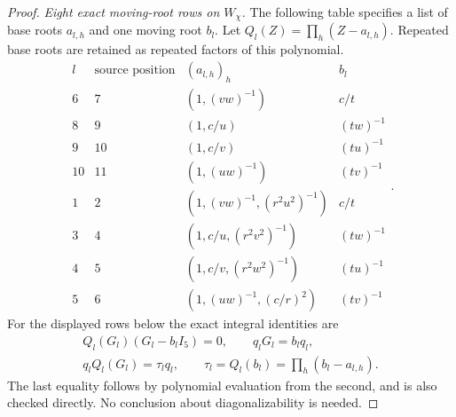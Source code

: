 \begin{proof}
\emph{Eight exact moving-root rows on $W_\chi$.}
The following table specifies a list of base
roots $a_{l,h}$ and one moving root $b_l$.
Let $Q_l(Z)=\prod_h(Z-a_{l,h})$.
Repeated base roots are retained as repeated
factors of this polynomial.
\[
 \begin{array}{c|c|c|c}
 l&\text{source position}&(a_{l,h})_h&b_l\\\hline
 6&7&(1,(vw)^{-1})&c/t\\
 8&9&(1,c/u)&(tw)^{-1}\\
 9&10&(1,c/v)&(tu)^{-1}\\
 10&11&(1,(uw)^{-1})&(tv)^{-1}\\
 1&2&(1,(vw)^{-1},(r^2u^2)^{-1})&c/t\\
 3&4&(1,c/u,(r^2v^2)^{-1})&(tw)^{-1}\\
 4&5&(1,c/v,(r^2w^2)^{-1})&(tu)^{-1}\\
 5&6&(1,(uw)^{-1},(c/r)^2)&(tv)^{-1}
 \end{array}.
                                                               \tag{F.31.10}
\]
For the displayed rows below the exact
integral identities are
\[
 \begin{gathered}
 Q_l(G_l)(G_l-b_lI_5)=0,\qquad q_lG_l=b_lq_l,\\
 q_lQ_l(G_l)=\tau_lq_l,
       \qquad \tau_l=Q_l(b_l)=\prod_h(b_l-a_{l,h}).
 \end{gathered}                                                \tag{F.31.11}
\]
The last equality follows by polynomial
evaluation from the second, and is also
checked directly. No conclusion about
diagonalizability is needed.


\end{proof}
